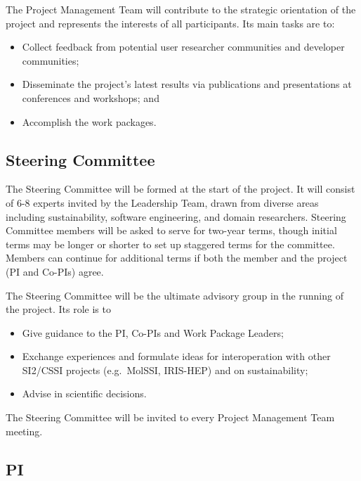 \documentclass[
]{book}
\providecommand{\tightlist}{%
  \setlength{\itemsep}{0pt}\setlength{\parskip}{0pt}}
\begin{document}
The Project Management Team will contribute to the strategic orientation of the project and represents
the interests of all participants. Its main tasks are to:

\begin{itemize}
\tightlist
\item
  Collect feedback from potential user researcher communities and developer communities;
\item
  Disseminate the project's latest results via publications and presentations at conferences and workshops; and
\item
  Accomplish the work packages.
\end{itemize}

\hypertarget{steering-committee}{%
\subsection{Steering Committee}\label{steering-committee}}

The Steering Committee will be formed at the start of the project. It will consist of 6-8 experts invited
by the Leadership Team, drawn from diverse areas including sustainability, software engineering, and
domain researchers. Steering Committee members will be asked to serve for two-year terms, though initial
terms may be longer or shorter to set up staggered terms for the committee. Members can continue for
additional terms if both the member and the project (PI and Co-PIs) agree.

The Steering Committee will be the ultimate advisory group in the running of the project. Its role is to

\begin{itemize}
\tightlist
\item
  Give guidance to the PI, Co-PIs and Work Package Leaders;
\item
  Exchange experiences and formulate ideas for interoperation with other SI2/CSSI projects
  (e.g.~MolSSI, IRIS-HEP) and on sustainability;
\item
  Advise in scientific decisions.
\end{itemize}

The Steering Committee will be invited to every Project Management Team meeting.

\hypertarget{pi}{%
\subsection{PI}\label{pi}}
\end{document}
